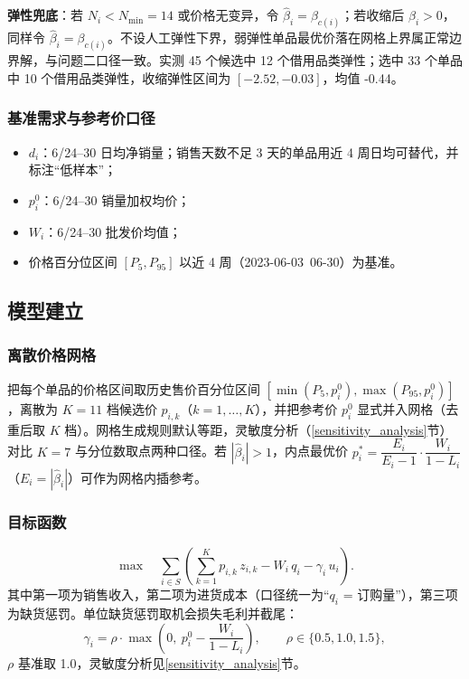 \textbf{弹性兜底}：若 $N_i<N_{\min}=14$ 或价格无变异，令 $\hat\beta_i=\beta_{c(i)}$；若收缩后 $\hat\beta_i>0$，同样令 $\hat\beta_i=\beta_{c(i)}$。不设人工弹性下界，弱弹性单品最优价落在网格上界属正常边界解，与问题二口径一致。实测 45 个候选中 12 个借用品类弹性；选中 33 个单品中 10 个借用品类弹性，收缩弹性区间为 $[-2.52,-0.03]$，均值 -0.44。

\subsubsection{基准需求与参考价口径}
\begin{itemize}
    \item $d_i$：6/24--30 日均净销量；销售天数不足 3 天的单品用近 4 周日均可替代，并标注“低样本”；
    \item $p_i^0$：6/24--30 销量加权均价；
    \item $W_i$：6/24--30 批发价均值；
    \item 价格百分位区间 $[P_5,P_{95}]$ 以近 4 周（2023-06-03~06-30）为基准。
\end{itemize}

\subsection{模型建立}

\subsubsection{离散价格网格}

把每个单品的价格区间取历史售价百分位区间 $[\min(P_5,p_i^0),\max(P_{95},p_i^0)]$，离散为 $K=11$ 档候选价 $p_{i,k}$（$k=1,\dots,K$），并把参考价 $p_i^0$ 显式并入网格（去重后取 $K$ 档）。网格生成规则默认等距，灵敏度分析（\ref{sensitivity_analysis}节）对比 $K=7$ 与分位数取点两种口径。若 $|\hat\beta_i|>1$，内点最优价 $p_i^*=\dfrac{E_i}{E_i-1}\cdot\dfrac{W_i}{1-L_i}$（$E_i=|\hat\beta_i|$）可作为网格内插参考。

\subsubsection{目标函数}

\begin{equation}
\max\quad \sum_{i\in S}\left(\sum_{k=1}^{K}p_{i,k}\,z_{i,k}-W_i\,q_i-\gamma_i\,u_i\right).
\end{equation}
其中第一项为销售收入，第二项为进货成本（口径统一为“$q_i$ = 订购量”），第三项为缺货惩罚。单位缺货惩罚取机会损失毛利并截尾：
\begin{equation}
\gamma_i=\rho\cdot\max\left(0,\ p_i^0-\frac{W_i}{1-L_i}\right),\qquad \rho\in\{0.5,1.0,1.5\},
\end{equation}
$\rho$ 基准取 1.0，灵敏度分析见\ref{sensitivity_analysis}节。

